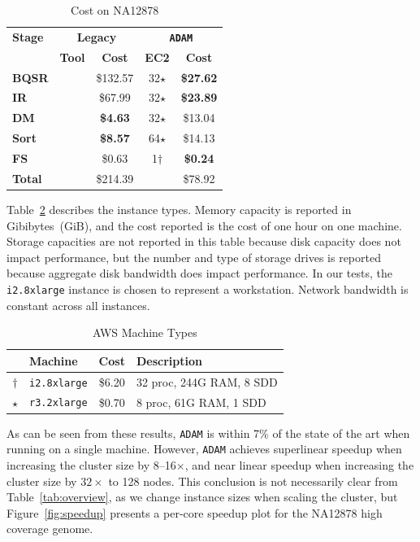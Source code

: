 \documentclass{sig-alternate}
\begin{document}
\begin{table}[h]
\caption{Cost on NA12878}
\label{tab:cost}
\begin{center}
\begin{tabular}{ l | c c | c c }
\hline
\bf Stage & \multicolumn{2}{c}{\bf Legacy} & \multicolumn{2}{c}{\bf \texttt{ADAM}} \\
 & \bf Tool & \bf Cost & \bf EC2 & \bf Cost \\
\hline
\bf BQSR & \cite{depristo11} & \$132.57 & 32$\star$ & \bf \$27.62 \\
\bf IR & \cite{depristo11} & \$67.99 & 32$\star$ & \bf \$23.89 \\
\bf DM & \cite{tarasov15} & \bf \$4.63 & 32$\star$ & \$13.04 \\
\bf Sort & \cite{tarasov15} & \bf \$8.57 & 64$\star$ & \$14.13 \\
\bf FS & \cite{tarasov15} & \$0.63 & 1$\dagger$ & \bf \$0.24 \\
\hline
\bf Total & & \$214.39 & & \$78.92 \\
\end{tabular}
\end{center}
\end{table}

Table~\ref{tab:machines} describes the instance types. Memory capacity is reported in Gibibytes~(GiB),
and the cost reported is the cost of one hour on one machine.
Storage capacities are not reported in this table because disk
capacity does not impact performance, but the number and type of storage drives is reported because
aggregate disk bandwidth does impact performance. In our tests, the \texttt{i2.8xlarge} instance is
chosen to represent a workstation. Network bandwidth is constant across all instances.

\begin{table}[h]
\caption{AWS Machine Types}
\label{tab:machines}
\begin{center}
\begin{tabular}{ c l c l }
\hline
 & \bf Machine & \bf Cost & \bf Description \\
\hline
\hline
$\dagger$ & \texttt{i2.8xlarge} & \$6.20 & 32 proc, 244G RAM, 8 SDD \\
$\star$ & \texttt{r3.2xlarge} & \$0.70 & 8 proc, 61G RAM, 1 SDD \\
\hline
\end{tabular}
\end{center}
\end{table}

As can be seen from these results, \texttt{ADAM} is within 7\% of the state of the art when running on a single machine.
However, \texttt{ADAM} achieves superlinear speedup when increasing the cluster size by 8--16$\times$, and near
linear speedup when increasing the cluster size by $32\times$ to 128 nodes. This conclusion is not necessarily clear
from Table~\ref{tab:overview}, as we change instance sizes when scaling the cluster, but Figure~\ref{fig:speedup}
presents a per-core speedup plot for the NA12878 high coverage genome.
\end{document}
